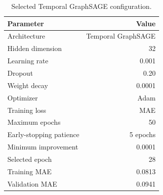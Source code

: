 \begin{table}[!htbp]
\centering
\footnotesize
\caption{Selected Temporal GraphSAGE configuration.}
\label{tab:selected-temporal-graphsage-configuration}
\begin{tabular}{lr}
\toprule
Parameter & Value \\
\midrule
Architecture & Temporal GraphSAGE \\
Hidden dimension & 32 \\
Learning rate & 0.001 \\
Dropout & 0.20 \\
Weight decay & 0.0001 \\
Optimizer & Adam \\
Training loss & MAE \\
Maximum epochs & 50 \\
Early-stopping patience & 5 epochs \\
Minimum improvement & 0.0001 \\
Selected epoch & 28 \\
Training MAE & 0.0813 \\
Validation MAE & 0.0941 \\
\bottomrule
\end{tabular}
\end{table}
